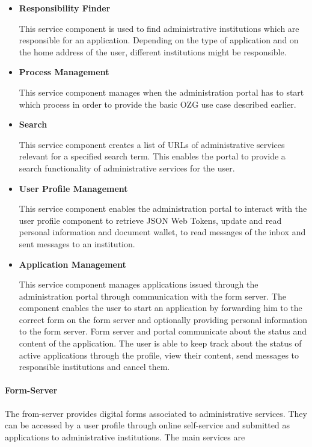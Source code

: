 \begin{itemize}
    \item \textbf{Responsibility Finder}
    
    This service component is used to find administrative institutions which are responsible for an application. Depending on the type of application and on the home address of the user, different institutions might be responsible.
    
    \item \textbf{Process Management}
    
    This service component manages when the administration portal has to start which process in order to provide the basic OZG use case described earlier.
    
    \item \textbf{Search}
    
    This service component creates a list of URLs of administrative services relevant for a specified search term. This enables the portal to provide a search functionality of administrative services for the user.
    
    \item \textbf{User Profile Management}
    
    This service component enables the administration portal to interact with the user profile component to retrieve JSON Web Tokens, update and read personal information and document wallet, to read messages of the inbox and sent messages to an institution.
    
    \item \textbf{Application Management}
    
    This service component manages applications issued through the administration portal through communication with the form server. The component enables the user to start an application by forwarding him to the correct form on the form server and optionally providing personal information to the form server. Form server and portal communicate about the status and content of the application. The user is able to keep track about the status of active applications through the profile, view their content, send messages to responsible institutions and cancel them.
    
\end{itemize}

\paragraph{Form-Server}
The from-server provides digital forms associated to administrative services. They can be accessed by a user profile through online self-service and submitted as applications to administrative institutions. The main services are \cite{dNRW:Standardisierungskonzeptzur}

